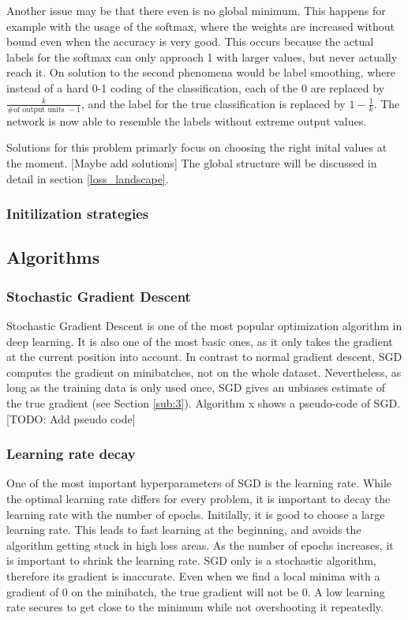 Another issue may be that there even is no global minimum. This happens for
example with the usage of the softmax, where the weights are increased without
bound even when the accuracy is very good. This occurs because the actual labels
for the softmax can only approach 1 with larger values, but never actually reach
it.  On solution to the second phenomena would be label smoothing, where instead
of a hard 0-1 coding of the classification, each of the 0 are replaced by
$\frac{k}{\textrm{\# of output units }-1}$, and the label for the true
classification is replaced by $1-\frac{1}{k}$. The network is now able to
resemble the labels without extreme output values.

Solutions for this problem primarly focus on choosing the right inital values at
the moment. [Maybe add solutions] 
The global structure will be discussed in detail in section \ref{loss_landscape}.

\subsubsection{Initilization strategies}




\subsection{Algorithms}
\subsubsection{Stochastic Gradient Descent}\label{SGD}
Stochastic Gradient Descent is one of the most popular optimization algorithm in
deep learning. It is also one of the most basic ones, as it only takes the
gradient at the current position into account. In contrast to normal gradient
descent, SGD computes the gradient on minibatches, not on the whole dataset.
Nevertheless, as long as the training data is only used once, SGD gives an
unbiases estimate of the true gradient (see Section \ref{sub:3}). Algorithm x
shows a pseudo-code of SGD.
[TODO: Add pseudo code]

\subsubsection{Learning rate decay}
One of the most important hyperparameters of SGD is the learning rate. While the
optimal learning rate differs for every problem, it is important to decay the
learning rate with the number of epochs. Initilally, it is good to choose a
large learning rate. This leads to fast learning at the beginning, and avoids
the algorithm getting stuck in high loss areas. As the number of epochs
increases, it is important to shrink the learning rate. SGD only is a stochastic
algorithm, therefore its gradient is inaccurate. Even when we find a local
minima with a gradient of 0 on the minibatch, the true gradient will not be 0. A
low learning rate secures to get close to the minimum while not overshooting it
repeatedly.

